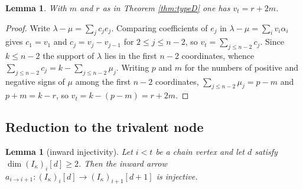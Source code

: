 \documentclass[reqno]{amsart}
\theoremstyle{plain}
\newtheorem{lemma}[theorem]{Lemma}
\theoremstyle{definition}
\newcommand{\la}{\lambda}
\newcommand{\al}{\alpha}
\newcommand{\ka}{\kappa}
\begin{document}
\begin{lemma}\label{lem:C}
With $m$ and $r$ as in Theorem \ref{thm:typeD} one has $v_t=r+2m$.
\end{lemma}

\begin{proof}
Write $\la-\mu=\sum_jc_je_j$.  Comparing coefficients of $e_j$ in
$\la-\mu=\sum_iv_i\al_i$ gives $c_1=v_1$ and $c_j=v_j-v_{j-1}$ for
$2\le j\le n-2$, so $v_t=\sum_{j\le n-2}c_j$.  Since $k\le n-2$ the support of
$\la$ lies in the first $n-2$ coordinates, whence
$\sum_{j\le n-2}c_j=k-\sum_{j\le n-2}\mu_j$.  Writing $p$ and $m$ for the
numbers of positive and negative signs of $\mu$ among the first $n-2$
coordinates, $\sum_{j\le n-2}\mu_j=p-m$ and $p+m=k-r$, so $v_t=k-(p-m)=r+2m$.
\end{proof}

\subsection{Reduction to the trivalent node}

\begin{lemma}[inward injectivity]\label{lem:Id}
Let $i<t$ be a chain vertex and let $d$ satisfy $\dim(I_\ka)_i[d]\ge2$.  Then
the inward arrow $a_{i\to i+1}:(I_\ka)_i[d]\to(I_\ka)_{i+1}[d+1]$ is injective.
\end{lemma}
\end{document}
